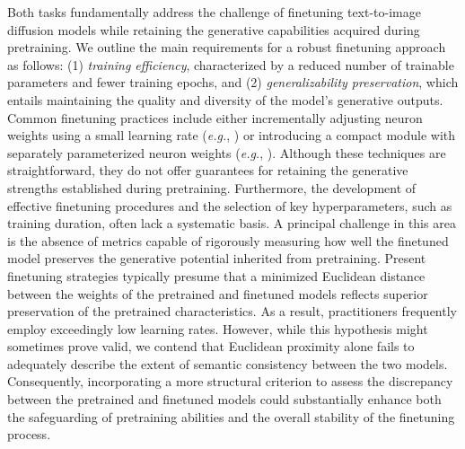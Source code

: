 Both tasks fundamentally address the challenge of finetuning text-to-image diffusion models while retaining the generative capabilities acquired during pretraining. We outline the main requirements for a robust finetuning approach as follows: (1) \emph{training efficiency}, characterized by a reduced number of trainable parameters and fewer training epochs, and (2) \emph{generalizability preservation}, which entails maintaining the quality and diversity of the model's generative outputs. Common finetuning practices include either incrementally adjusting neuron weights using a small learning rate (\emph{e.g.}, \cite{ruiz2023dreambooth}) or introducing a compact module with separately parameterized neuron weights (\emph{e.g.}, \cite{hulora2022,zhang2023adding}). Although these techniques are straightforward, they do not offer guarantees for retaining the generative strengths established during pretraining. Furthermore, the development of effective finetuning procedures and the selection of key hyperparameters, such as training duration, often lack a systematic basis. A principal challenge in this area is the absence of metrics capable of rigorously measuring how well the finetuned model preserves the generative potential inherited from pretraining. Present finetuning strategies typically presume that a minimized Euclidean distance between the weights of the pretrained and finetuned models reflects superior preservation of the pretrained characteristics. As a result, practitioners frequently employ exceedingly low learning rates. However, while this hypothesis might sometimes prove valid, we contend that Euclidean proximity alone fails to adequately describe the extent of semantic consistency between the two models. Consequently, incorporating a more structural criterion to assess the discrepancy between the pretrained and finetuned models could substantially enhance both the safeguarding of pretraining abilities and the overall stability of the finetuning process.

